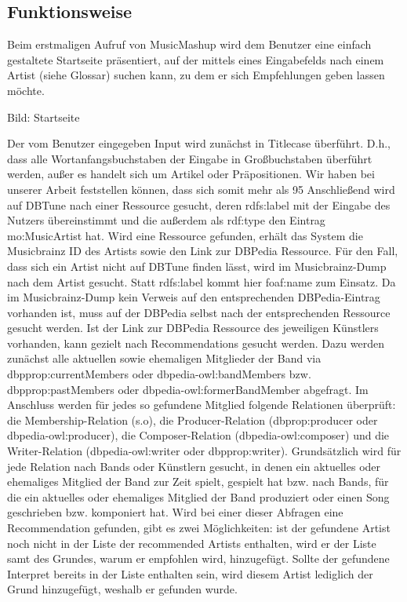 \subsection{Funktionsweise}


Beim erstmaligen Aufruf von MusicMashup wird dem Benutzer eine einfach gestaltete Startseite präsentiert, auf der mittels eines Eingabefelds nach einem Artist (siehe Glossar) suchen kann, zu dem er sich Empfehlungen geben lassen möchte.


Bild: Startseite


Der vom Benutzer eingegeben Input wird zunächst in Titlecase überführt. D.h., dass alle Wortanfangsbuchstaben der Eingabe in Großbuchstaben überführt werden, außer es handelt sich um Artikel oder Präpositionen. Wir haben bei unserer Arbeit feststellen können, dass sich somit mehr als 95%
Anschließend wird auf DBTune nach einer Ressource gesucht, deren rdfs:label mit der Eingabe des Nutzers übereinstimmt und die außerdem als rdf:type den Eintrag mo:MusicArtist hat. Wird eine Ressource gefunden, erhält das System die Musicbrainz ID des Artists sowie den Link zur DBPedia Ressource.
Für den Fall, dass sich ein Artist nicht auf DBTune finden lässt, wird im Musicbrainz-Dump nach dem Artist gesucht. Statt rdfs:label kommt hier foaf:name zum Einsatz. Da im Musicbrainz-Dump kein Verweis auf den entsprechenden DBPedia-Eintrag vorhanden ist, muss auf der DBPedia selbst nach der entsprechenden Ressource gesucht werden.
Ist der Link zur DBPedia Ressource des jeweiligen Künstlers vorhanden, kann gezielt nach Recommendations gesucht werden. Dazu werden zunächst alle aktuellen sowie ehemaligen Mitglieder der Band via dbpprop:currentMembers oder dbpedia-owl:bandMembers  bzw. dbpprop:pastMembers oder dbpedia-owl:formerBandMember abgefragt. Im Anschluss werden für jedes so gefundene Mitglied folgende Relationen überprüft:
die Membership-Relation (s.o), die Producer-Relation (dbprop:producer oder dbpedia-owl:producer), die Composer-Relation (dbpedia-owl:composer) und die Writer-Relation (dbpedia-owl:writer oder dbpprop:writer). Grundsätzlich wird für jede Relation nach Bands oder Künstlern gesucht, in denen ein aktuelles oder ehemaliges Mitglied der Band zur Zeit spielt, gespielt hat bzw. nach Bands, für die ein aktuelles oder ehemaliges Mitglied der Band produziert oder einen Song geschrieben bzw. komponiert hat. Wird bei einer dieser Abfragen eine Recommendation gefunden, gibt es zwei Möglichkeiten: ist der gefundene Artist noch nicht in der Liste der recommended Artists enthalten, wird er der Liste samt des Grundes, warum er empfohlen wird, hinzugefügt. Sollte der gefundene Interpret bereits in der Liste enthalten sein, wird diesem Artist lediglich der Grund hinzugefügt, weshalb er gefunden wurde. 
